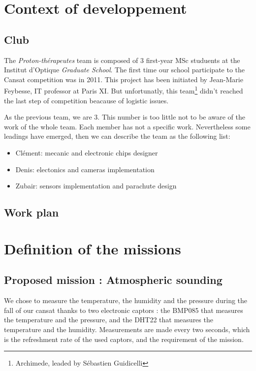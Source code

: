\documentclass[twocolumn,10pt]{article}
\begin{document}
\section{Context of developpement}%
    \subsection{Club}%
    \par The \textit{Proton-thérapeutes} team is composed of 3 first-year MSc studuents at the Institut d'Optique \textit{Graduate School}. The first time our school participate to the Cansat competition was in 2011. This project has been initiated by Jean-Marie Feybesse, IT professor at Paris XI. But unfortunatly, this team\footnote{Archimede, leaded by Sébastien Guidicelli} didn't reached the last step of competition beacause of logistic issues.
    \par As the previous team, we are 3. This number is too little not to be aware of the work of the whole team. Each member has not a specific work. Nevertheless some leadings have emerged, then we can describe the team as the following list:
    \begin{itemize}
        \item Clément: mecanic and electronic chips designer
        \item Denis: electonics and cameras implementation
        \item Zubair: sensors implementation and parachute design
    \end{itemize}
    \subsection{Work plan}%
\section{Definition of the missions}%
    \subsection{Proposed mission : Atmospheric sounding}%
        \par We chose to measure the temperature, the humidity and the pressure during the fall of our cansat thanks to two electronic captors : the BMP085 that measures the temperature and the pressure, and the DHT22 that measures the temperature and the humidity. Measurements are made every two seconds, which is the refreshment rate of the used captors, and the requirement of the mission.
\end{document}
